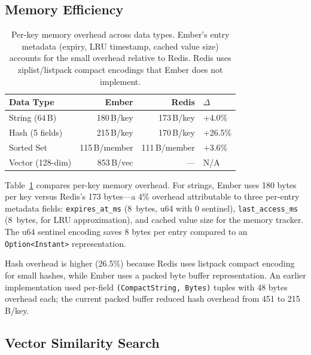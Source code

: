 \documentclass[conference]{IEEEtran}
\begin{document}
\subsection{Memory Efficiency}

\begin{table}[t]
\centering
\caption{Per-key memory overhead across data types. Ember's entry
metadata (expiry, LRU timestamp, cached value size) accounts for the
small overhead relative to Redis. Redis uses ziplist/listpack compact
encodings that Ember does not implement.}
\label{tab:memory}
\small
\begin{tabular}{@{}lrrl@{}}
\toprule
\textbf{Data Type} & \textbf{Ember} & \textbf{Redis} & \textbf{$\Delta$} \\
\midrule
String (64\,B)     & 180\,B/key    & 173\,B/key   & +4.0\% \\
Hash (5 fields)    & 215\,B/key    & 170\,B/key   & +26.5\% \\
Sorted Set         & 115\,B/member & 111\,B/member & +3.6\% \\
Vector (128-dim)   & 853\,B/vec    & ---           & N/A \\
\bottomrule
\end{tabular}
\end{table}

Table~\ref{tab:memory} compares per-key memory overhead. For strings,
Ember uses 180 bytes per key versus Redis's 173 bytes---a 4\%
overhead attributable to three per-entry metadata fields:
\texttt{expires\_at\_ms} (8~bytes, u64 with 0 sentinel),
\texttt{last\_access\_ms} (8~bytes, for LRU approximation), and
cached value size for the memory tracker. The u64 sentinel encoding
saves 8 bytes per entry compared to an \texttt{Option<Instant>}
representation.

Hash overhead is higher (26.5\%) because Redis uses listpack compact
encoding for small hashes, while Ember uses a packed byte buffer
representation. An earlier implementation used per-field
\texttt{(CompactString, Bytes)} tuples with 48 bytes overhead each;
the current packed buffer reduced hash overhead from 451 to
215\,B/key.


\subsection{Vector Similarity Search}
\end{document}
